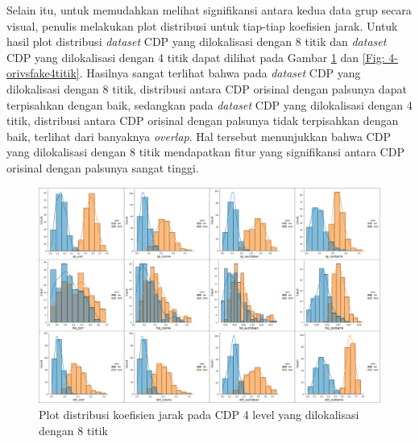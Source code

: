 Selain itu, untuk memudahkan melihat signifikansi antara kedua data grup secara visual, penulis melakukan plot distribusi untuk tiap-tiap koefisien jarak.
Untuk hasil plot distribusi \emph{dataset} CDP yang dilokalisasi dengan 8 titik dan \emph{dataset} CDP yang dilokalisasi dengan 4 titik dapat dilihat pada
Gambar \ref{Fig: 4-4levelorivs4levelfake} dan \ref{Fig: 4-orivsfake4titik}. Hasilnya sangat terlihat bahwa pada \emph{dataset} CDP yang dilokalisasi dengan 8
titik, distribusi antara CDP orisinal dengan palsunya dapat terpisahkan dengan baik, sedangkan pada \emph{dataset} CDP yang dilokalisasi dengan 4 titik,
distribusi antara CDP orisinal dengan palsunya tidak terpisahkan dengan baik, terlihat dari banyaknya \emph{overlap}. Hal tersebut menunjukkan bahwa CDP yang
dilokalisasi dengan 8 titik mendapatkan fitur yang signifikansi antara CDP orisinal dengan palsunya sangat tinggi.



\clearpage

\begin{figure}[!h]
	\centering
	\includegraphics[width=\textwidth]{contents/chapter-4/4-4levelorivs4levelfake.png}
	\caption{Plot distribusi koefisien jarak pada CDP 4 level yang dilokalisasi dengan 8 titik}
	\label{Fig: 4-4levelorivs4levelfake}
\end{figure}

